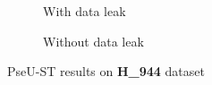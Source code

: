         \begin{figure}[H]
            \centering
            \begin{subfigure}{0.47\textwidth}
              \centering
              \resizebox{\textwidth}{!}{}
              \captionsetup{justification=centering}
              \caption{With data leak}
            \end{subfigure}%
            \hspace{0.05\textwidth}
            \begin{subfigure}{0.47\textwidth}
              \centering
              \resizebox{\textwidth}{!}{}
              \captionsetup{justification=centering}
              \caption{Without data leak}
            \end{subfigure}
            \caption{PseU-ST results on \textbf{H\_944} dataset}\label{fig:pseu-st_m944}
        \end{figure}

%
